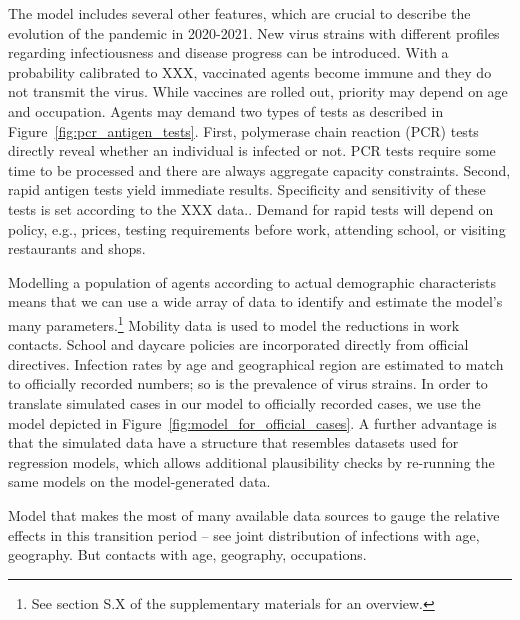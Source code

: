 The model includes several other features, which are crucial to describe the evolution of the pandemic in 2020-2021. New virus strains with different profiles regarding infectiousness and disease progress can be introduced. With a probability calibrated to XXX, vaccinated agents become immune and they do not transmit the virus. While vaccines are rolled out, priority may depend on age and occupation. Agents may demand two types of tests as described in Figure~\ref{fig:pcr_antigen_tests}. First, polymerase chain reaction (PCR) tests directly reveal whether an individual is infected or not. PCR tests require some time to be processed and there are always aggregate capacity constraints. Second, rapid antigen tests yield immediate results. Specificity and sensitivity of these tests is set according to the XXX data.. Demand for rapid tests will depend on policy, e.g., prices, testing requirements before work, attending school, or visiting restaurants and shops.

Modelling a population of agents according to actual demographic characterists means that we can use a wide array of data to identify and estimate the model's many parameters.\footnote{See section S.X of the supplementary materials for an overview.} Mobility data is used to model the reductions in work contacts. School and daycare policies are incorporated directly from official directives. Infection rates by age and geographical region are estimated to match to officially recorded numbers; so is the prevalence of virus strains. In order to translate simulated cases in our model to officially recorded cases, we use the model depicted in Figure~\ref{fig:model_for_official_cases}.  A further advantage is that the simulated data have a structure that resembles datasets used for regression models, which allows additional plausibility checks by re-running the same models on the model-generated data.

Model that makes the most of many available data sources to gauge the relative effects in this transition period -- see joint distribution of infections with age, geography. But contacts with age, geography, occupations.

